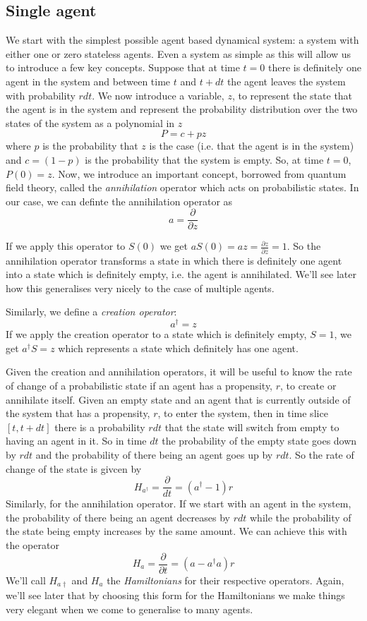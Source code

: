 \documentclass[letterpaper,twocolumn,10pt]{article}
\begin{document}
\subsection{Single agent}
We start with the simplest possible agent based dynamical system: a system with either one or zero stateless agents. Even a system as simple as this will allow us to introduce a few key concepts. Suppose that at time $t=0$ there is definitely one agent in the system and between time $t$ and $t+dt$ the agent leaves the system with probability $rdt$. We now introduce a variable, $z$, to represent the state that the agent is in the system and represent the probability distribution over the two states of the system as a polynomial in $z$
\[
P = c + pz
\]
where $p$ is the probability that $z$ is the case (i.e. that the agent is in the system) and $c = (1-p)$ is the probability that the system is empty. So, at time $t=0$, $P(0) = z$. Now, we introduce an important concept, borrowed from quantum field theory, called the \textit{annihilation} operator which acts on probabilistic states. In our case, we can definte the annihilation operator as
\[
a = \frac{\partial}{\partial z}
\]

If we apply this operator to $S(0)$ we get $aS(0) = az = \frac{\partial z}{\partial z} = 1$. So the annihilation operator transforms a state in which there is definitely one agent into a state which is definitely empty, i.e. the agent is annihilated. We'll see later how this generalises very nicely to the case of multiple agents.

Similarly, we define a \textit{creation operator}:
\[
a^{\dag} = z
\]
If we apply the creation operator to a state which is definitely empty, $S=1$, we get $a^\dag S=z$ which represents a state which definitely has one agent.

Given the creation and annihilation operators, it will be useful to know the rate of change of a probabilistic state if an agent has a propensity, $r$, to create or annihilate itself. Given an empty state and an agent that is currently outside of the system that has a propensity, $r$, to enter the system, then in time slice $[t, t+dt]$ there is a probability $rdt$ that the state will switch from empty to having an agent in it. So in time $dt$ the probability of the empty state goes down by $rdt$ and the probability of there being an agent goes up by $rdt$. So the rate of change of the state is givcen by
\[
H_{a^\dag} = \frac{\partial}{dt} = (a^\dag - 1)r
\]
Similarly, for the annihilation operator. If we start with an agent in the system, the probability of there being an agent decreases by $rdt$ while the probability of the state being empty increases by the same amount. We can achieve this with the operator
\[
H_a = \frac{\partial}{\partial t} = (a - a^{\dag}a)r
\]
We'll call $H_{a\dag}$ and $H_a$ the \textit{Hamiltonians} for their respective operators. Again, we'll see later that by choosing this form for the Hamiltonians we make things very elegant when we come to generalise to many agents.
\end{document}
